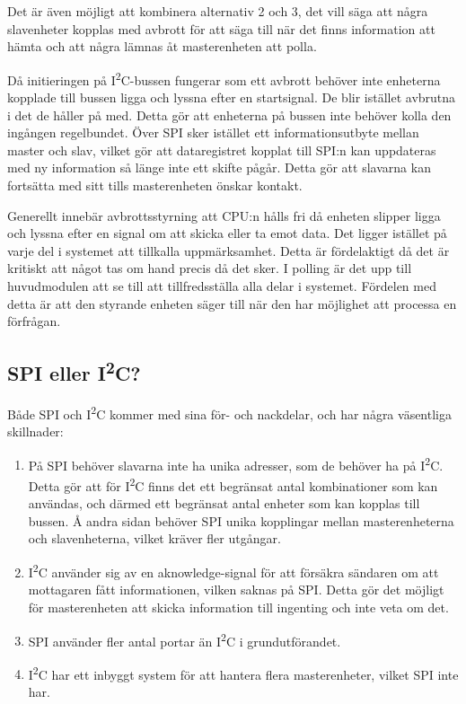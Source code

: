 \documentclass[11pt]{article}
\begin{document}
\begin{flushleft}
Det är även möjligt att kombinera alternativ 2 och 3, det vill säga att några slavenheter kopplas med avbrott för att säga till när det finns information att hämta och att några lämnas åt masterenheten att polla.




Då initieringen på I\textsuperscript{2}C-bussen fungerar som ett avbrott behöver inte enheterna kopplade till bussen ligga och lyssna efter en startsignal. De blir istället avbrutna i det de håller på med.\cite{guideI2C} Detta gör att enheterna på bussen inte behöver kolla den ingången regelbundet. Över SPI sker istället ett informationsutbyte mellan master och slav, vilket gör att dataregistret kopplat till SPI:n kan uppdateras med ny information så länge inte ett skifte pågår. Detta gör att slavarna kan fortsätta med sitt tills masterenheten önskar kontakt. \cite{ATMega16}

Generellt innebär avbrottsstyrning att CPU:n hålls fri då enheten slipper ligga och lyssna efter en signal om att skicka eller ta emot data. Det ligger istället på varje del i systemet att tillkalla uppmärksamhet. Detta är fördelaktigt då det är kritiskt att något tas om hand precis då det sker. I polling är det upp till huvudmodulen att se till att tillfredsställa alla delar i systemet. Fördelen med detta är att den styrande enheten säger till när den har möjlighet att processa en förfrågan. \cite{interruptPoll}

\subsection{SPI eller I\textsuperscript{2}C?}
Både SPI och I\textsuperscript{2}C kommer med sina för- och nackdelar, och har några väsentliga skillnader:

\begin{enumerate}
	\item På SPI behöver slavarna inte ha unika adresser, som de behöver ha på I\textsuperscript{2}C. Detta gör att för I\textsuperscript{2}C finns det ett begränsat antal kombinationer som kan användas, och därmed ett begränsat antal enheter som kan kopplas till bussen. Å andra sidan behöver SPI unika kopplingar mellan masterenheterna och slavenheterna, vilket kräver fler utgångar.
	\item I\textsuperscript{2}C använder sig av en aknowledge-signal för att försäkra sändaren om att mottagaren fått informationen, vilken saknas på SPI. Detta gör det möjligt för masterenheten att skicka information till ingenting och inte veta om det. 
	\item SPI använder fler antal portar än I\textsuperscript{2}C i grundutförandet.
	\item I\textsuperscript{2}C har ett inbyggt system för att hantera flera masterenheter, vilket SPI inte har.
\end{enumerate}


\end{flushleft}
\end{document}

